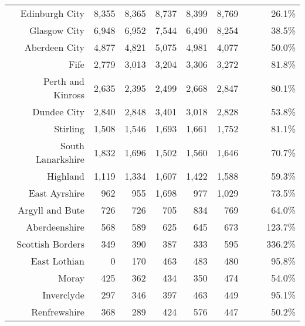 \documentclass[
  12pt,
]{article}
\begin{document}
\begin{longtable}[t]{rrrrrrrrr}
\endfoot
\bottomrule
\endlastfoot
Edinburgh City & 8,355 & 8,365 & 8,737 & 8,399 & 8,769 & \cellcolor{white}{  4.4\%} & \cellcolor{white}{  1.2\%} & 26.1\%\\
Glasgow City & 6,948 & 6,952 & 7,544 & 6,490 & 8,254 & \cellcolor{white}{ 27.2\%} & \cellcolor{white}{  4.4\%} & 38.5\%\\
Aberdeen City & 4,877 & 4,821 & 5,075 & 4,981 & 4,077 & \cellcolor{white}{-18.1\%} & \cellcolor{white}{ -4.4\%} & 50.0\%\\
Fife & 2,779 & 3,013 & 3,204 & 3,306 & 3,272 & \cellcolor{white}{ -1.0\%} & \cellcolor{white}{  4.2\%} & 81.8\%\\
Perth and Kinross & 2,635 & 2,395 & 2,499 & 2,668 & 2,847 & \cellcolor{white}{  6.7\%} & \cellcolor{white}{  2.0\%} & 80.1\%\\
Dundee City & 2,840 & 2,848 & 3,401 & 3,018 & 2,828 & \cellcolor{white}{ -6.3\%} & \cellcolor{white}{ -0.1\%} & 53.8\%\\
Stirling & 1,508 & 1,546 & 1,693 & 1,661 & 1,752 & \cellcolor{white}{  5.5\%} & \cellcolor{white}{  3.8\%} & 81.1\%\\
South Lanarkshire & 1,832 & 1,696 & 1,502 & 1,560 & 1,646 & \cellcolor{white}{  5.5\%} & \cellcolor{white}{ -2.6\%} & 70.7\%\\
Highland & 1,119 & 1,334 & 1,607 & 1,422 & 1,588 & \cellcolor{white}{ 11.7\%} & \cellcolor{white}{  9.1\%} & 59.3\%\\
East Ayrshire & 962 & 955 & 1,698 & 977 & 1,029 & \cellcolor{white}{  5.3\%} & \cellcolor{white}{  1.7\%} & 73.5\%\\
Argyll and Bute & 726 & 726 & 705 & 834 & 769 & \cellcolor{white}{ -7.8\%} & \cellcolor{white}{  1.4\%} & 64.0\%\\
Aberdeenshire & 568 & 589 & 625 & 645 & 673 & \cellcolor{white}{  4.3\%} & \cellcolor{white}{  4.3\%} & 123.7\%\\
Scottish Borders & 349 & 390 & 387 & 333 & 595 & \cellcolor{white}{ 78.7\%} & \cellcolor{white}{ 14.3\%} & 336.2\%\\
East Lothian & 0 & 170 & 463 & 483 & 480 & \cellcolor{white}{ -0.6\%} & \cellcolor{white}{} & 95.8\%\\
Moray & 425 & 362 & 434 & 350 & 474 & \cellcolor{white}{ 35.4\%} & \cellcolor{white}{  2.8\%} & 54.0\%\\
Inverclyde & 297 & 346 & 397 & 463 & 449 & \cellcolor{white}{ -3.0\%} & \cellcolor{white}{ 10.9\%} & 95.1\%\\
Renfrewshire & 368 & 289 & 424 & 576 & 447 & \cellcolor{white}{-22.4\%} & \cellcolor{white}{  5.0\%} & 50.2\%\\

\end{longtable}
\end{document}
